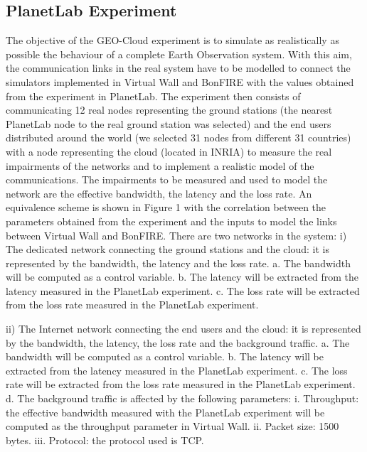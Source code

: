 \subsection{PlanetLab Experiment}

The objective of the GEO-Cloud experiment is to simulate as realistically as possible the behaviour of a complete Earth Observation system. With this aim, the communication links in the real system have to be modelled to connect the simulators implemented in Virtual Wall and BonFIRE with the values obtained from the experiment in PlanetLab. The experiment then consists of communicating 12 real nodes representing the ground stations (the nearest PlanetLab node to the real ground station was selected) and the end users distributed around the world (we selected 31 nodes from different 31 countries) with a node representing the cloud (located in INRIA) to measure the real impairments of the networks and to implement a realistic model of the communications. The impairments to be measured and used to model the network are the effective bandwidth, the latency and the loss rate.
An equivalence scheme is shown in Figure 1 with the correlation between the parameters obtained from the experiment and the inputs to model the links between Virtual Wall and BonFIRE.  There are two networks in the system: 
i)	The dedicated network connecting the ground stations and the cloud: it is represented by the bandwidth, the latency and the loss rate. 
a.	The bandwidth will be computed as a control variable.
b.	The latency will be extracted from the latency measured in the PlanetLab experiment.
c.	The loss rate will be extracted from the loss rate measured in the PlanetLab experiment.
 
ii)	The Internet network connecting the end users and the cloud: it is represented by the bandwidth, the latency, the loss rate and the background traffic.
a.	The bandwidth will be computed as a control variable.
b.	The latency will be extracted from the latency measured in the PlanetLab experiment.
c.	The loss rate will be extracted from the loss rate measured in the PlanetLab experiment.
d.	The background traffic is affected by the following parameters:
i.	Throughput: the effective bandwidth measured with the PlanetLab experiment will be computed as the throughput parameter in Virtual Wall.
ii.	Packet size: 1500 bytes.
iii.	Protocol: the protocol used is TCP.

